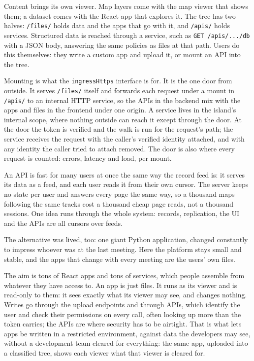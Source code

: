 \documentclass[11pt,oneside]{book}
\begin{document}
Content brings its own viewer. Map layers come with the map viewer that shows
them; a dataset comes with the React app that explores it. The tree has two
halves: \texttt{/files/} holds data and the apps that go with it, and
\texttt{/apis/} holds services. Structured data is reached through a service,
such as \texttt{GET /apis/.../db} with a JSON body, answering the same policies as
files at that path. Users do this themselves: they write a custom app and upload
it, or mount an API into the tree.

Mounting is what the \texttt{ingressHttps} interface is for. It is the one door
from outside. It serves \texttt{/files/} itself and forwards each request under
a mount in \texttt{/apis/} to an internal HTTP service, so the APIs in the
backend mix with the apps and files in the frontend under one origin. A service
lives in the island's internal scope, where nothing outside can reach it except
through the door. At the door the token is verified and the walk is run for the
request's path; the service receives the request with the caller's verified
identity attached, and with any identity the caller tried to attach removed. The
door is also where every request is counted: errors, latency and load, per
mount.

An API is fast for many users at once the same way the record feed is: it serves
its data as a feed, and each user reads it from their own cursor. The server
keeps no state per user and answers every page the same way, so a thousand maps
following the same tracks cost a thousand cheap page reads, not a thousand
sessions. One idea runs through the whole system: records, replication, the UI
and the APIs are all cursors over feeds.

The alternative was lived, too: one giant Python application, changed constantly
to impress whoever was at the last meeting. Here the platform stays small and
stable, and the apps that change with every meeting are the users' own files.

The aim is tons of React apps and tons of services, which people assemble from
whatever they have access to. An app is just files. It runs as its viewer and
is read-only to them: it sees exactly what its viewer may see, and changes
nothing. Writes go through the upload endpoints and through APIs, which identify
the user and check their permissions on every call, often looking up more than
the token carries; the APIs are where security has to be airtight. That is what
lets apps be written in a restricted environment, against data the developers may
see, without a development team cleared for everything: the same app, uploaded
into a classified tree, shows each viewer what that viewer is cleared for.
\end{document}
